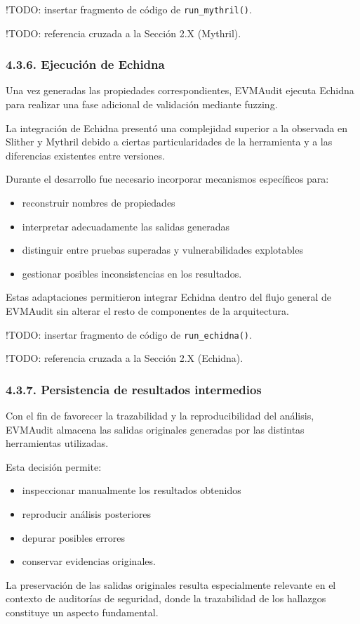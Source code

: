 !TODO: insertar fragmento de código de \texttt{run\_mythril()}.

!TODO: referencia cruzada a la Sección 2.X (Mythril).

\subsubsection{4.3.6. Ejecución de
Echidna}\label{ejecuciuxf3n-de-echidna}

Una vez generadas las propiedades correspondientes, EVMAudit ejecuta
Echidna para realizar una fase adicional de validación mediante fuzzing.

La integración de Echidna presentó una complejidad superior a la
observada en Slither y Mythril debido a ciertas particularidades de la
herramienta y a las diferencias existentes entre versiones.

Durante el desarrollo fue necesario incorporar mecanismos específicos
para:

\begin{itemize}
\tightlist
\item
  reconstruir nombres de propiedades
\item
  interpretar adecuadamente las salidas generadas
\item
  distinguir entre pruebas superadas y vulnerabilidades explotables
\item
  gestionar posibles inconsistencias en los resultados.
\end{itemize}

Estas adaptaciones permitieron integrar Echidna dentro del flujo general
de EVMAudit sin alterar el resto de componentes de la arquitectura.

!TODO: insertar fragmento de código de \texttt{run\_echidna()}.

!TODO: referencia cruzada a la Sección 2.X (Echidna).

\subsubsection{4.3.7. Persistencia de resultados
intermedios}\label{persistencia-de-resultados-intermedios}

Con el fin de favorecer la trazabilidad y la reproducibilidad del
análisis, EVMAudit almacena las salidas originales generadas por las
distintas herramientas utilizadas.

Esta decisión permite:

\begin{itemize}
\tightlist
\item
  inspeccionar manualmente los resultados obtenidos
\item
  reproducir análisis posteriores
\item
  depurar posibles errores
\item
  conservar evidencias originales.
\end{itemize}

La preservación de las salidas originales resulta especialmente
relevante en el contexto de auditorías de seguridad, donde la
trazabilidad de los hallazgos constituye un aspecto fundamental.
